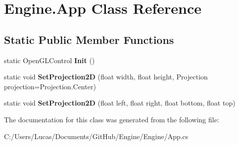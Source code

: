 \hypertarget{class_engine_1_1_app}{\section{Engine.\-App Class Reference}
\label{class_engine_1_1_app}
}
\subsection*{Static Public Member Functions}
\begin{DoxyCompactItemize}
\item 
\hypertarget{class_engine_1_1_app_a315fe14a9f658db6b6fa19d2f9debbd1}{static Open\-G\-L\-Control {\bfseries Init} ()}\label{class_engine_1_1_app_a315fe14a9f658db6b6fa19d2f9debbd1}

\item 
\hypertarget{class_engine_1_1_app_a3135cd61cb9c794e29d14feecc6e2047}{static void {\bfseries Set\-Projection2\-D} (float width, float height, Projection projection=Projection.\-Center)}\label{class_engine_1_1_app_a3135cd61cb9c794e29d14feecc6e2047}

\item 
\hypertarget{class_engine_1_1_app_ad80d42c948b067df7e8ddc8f5334be1f}{static void {\bfseries Set\-Projection2\-D} (float left, float right, float bottom, float top)}\label{class_engine_1_1_app_ad80d42c948b067df7e8ddc8f5334be1f}

\end{DoxyCompactItemize}


The documentation for this class was generated from the following file\-:\begin{DoxyCompactItemize}
\item 
C\-:/\-Users/\-Lucas/\-Documents/\-Git\-Hub/\-Engine/\-Engine/App.\-cs\end{DoxyCompactItemize}
